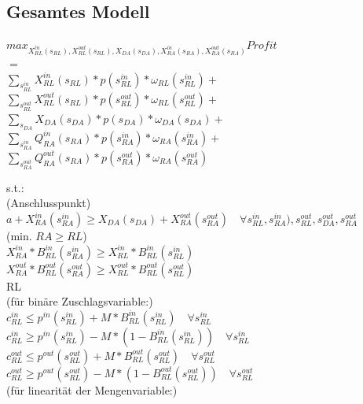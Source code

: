 \documentclass{article}
\begin{document}
\subsection{Gesamtes Modell}
\begin{center}
$max_{X^{in}_{RL}(s_{RL}), X^{out}_{RL}(s_{RL}), X_{DA}(s_{DA}), X^{in}_{RA}(s_{RA}), X^{out}_{RA}(s_{RA})} Profit $\\
$=$\\
        $\sum_{s^{in}_{RL}} X^{in}_{RL}(s_{RL}) * p(s^{in}_{RL}) * \omega_{RL}(s^{in}_{RL}) +$\\
        $\sum_{s^{out}_{RL}} X^{out}_{RL}(s_{RL}) * p(s^{out}_{RL}) * \omega_{RL}(s^{out}_{RL}) +$\\
        $\sum_{s_{DA}} X_{DA}(s_{DA}) * p(s_{DA}) * \omega_{DA}(s_{DA}) +$\\
	$\sum_{s^{in}_{RA}} Q^{in}_{RA}(s_{RA}) * p(s^{in}_{RA}) * \omega_{RA}(s^{in}_{RA}) +$\\
	$\sum_{s^{out}_{RA}} Q^{out}_{RA}(s_{RA}) * p(s^{out}_{RA}) * \omega_{RA}(s^{out}_{RA})$\\
\end{center}
s.t.:\\
(Anschlusspunkt)\\
        $a + X^{in}_{RA}(s^{in}_{RA}) \geq X_{DA}(s_{DA}) + X^{out}_{RA}(s^{out}_{RA}) \quad\forall s^{in}_{RL},s^{in}_{RA}),s^{out}_{RL},s^{out}_{DA},s^{out}_{RA} $\\
(min. $RA \geq RL$)\\
        $ X^{in}_{RA} * B^{in}_{RL}(s^{in}_{RA}) \geq X^{in}_{RL} * B^{in}_{RL}(s^{in}_{RL})$\\
        $ X^{out}_{RA} * B^{out}_{RL}(s^{out}_{RA}) \geq X^{out}_{RL} * B^{out}_{RL}(s^{out}_{RL})$\\
RL\\
        (für binäre Zuschlagsvariable:)\\
        $c^{in}_{RL} \leq p^{in}(s^{in}_{RL}) + M * B^{in}_{RL}(s^{in}_{RL})\quad\forall s^{in}_{RL} $ \\
        $c^{in}_{RL} \geq p^{in}(s^{in}_{RL}) - M * (1 - B^{in}_{RL}(s^{in}_{RL}))\quad\forall s^{in}_{RL} $ \\
        $c^{out}_{RL} \leq p^{out}(s^{out}_{RL}) + M * B^{out}_{RL}(s^{out}_{RL})\quad\forall s^{out}_{RL} $ \\
        $c^{out}_{RL} \geq p^{out}(s^{out}_{RL}) - M * (1 - B^{out}_{RL}(s^{out}_{RL}))\quad\forall s^{out}_{RL}$  \\
        (für linearität der Mengenvariable:)\\
\end{document}

